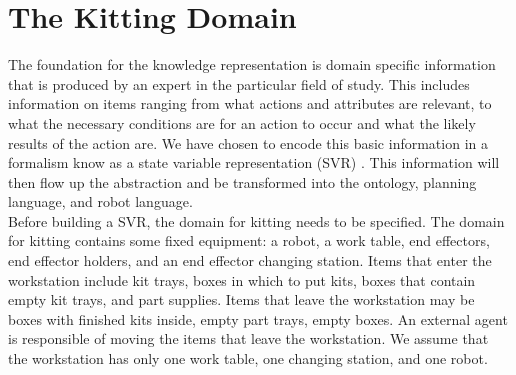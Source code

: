 \section{The Kitting Domain}\label{kitting_domain}

The foundation for the knowledge representation is domain specific information that is produced by an expert in the particular field of study. This includes
information on items ranging from what actions and attributes are relevant, to what the necessary conditions are for an action to occur and what the
likely results of the action are. We have chosen to encode this basic information in a formalism know as a state variable representation (SVR) \cite{NAU.2004}.
This information will then flow up the abstraction and be transformed into the ontology, planning language, and robot language.\\
Before building a SVR, the domain for kitting needs to be specified. The domain for kitting contains some fixed equipment: a robot, a work table, end effectors, end effector holders, and an end effector changing station. Items that enter the workstation include kit trays, boxes in which to put kits, boxes that contain empty kit trays, and part supplies. Items that leave the workstation may be boxes with finished kits inside, empty part trays, empty boxes. An external agent is responsible of moving the items that leave the workstation. We assume that the workstation has only one work table, one changing station, and one robot. 